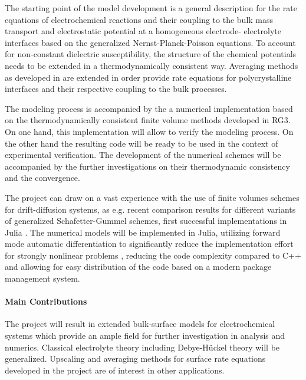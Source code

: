 \documentclass[a4paper,10pt]{article}
\begin{document}

The starting point  of the model development is  a general description
for the rate  equations of electrochemical reactions and their coupling to the bulk mass transport
and electrostatic potential at a homogeneous
electrode- electrolyte  interfaces based on the generalized Nernst-Planck-Poisson equations.
To account for non-constant dielectric susceptibility, the structure of the chemical potentials
needs to be extended in a thermodynamically consistent way.
Averaging methods as  developed in
\cite{JES}  are   extended  in   order  provide  rate   equations  for
polycrystalline interfaces  and their respective coupling to the bulk processes.

The modeling process is accompanied by the a numerical implementation based on the
thermodynamically consistent finite volume methods developed in RG3.
On one hand, this implementation will allow to verify the modeling process. On the other
hand the resulting code will be ready to be used in the context of experimental verification.
The development of the numerical schemes will be accompanied by the further investigations
on their thermodynamic consistency and the convergence.

The project can draw on a vast experience with the use of finite volumes schemes for drift-diffusion systems,
as e.g. recent comparison results for different variants of generalized Schafetter-Gummel
schemes, first successful implementations in Julia \cite{VagnerEtAl2019, VoronoiFVM}.
The numerical models will be implemented in  Julia, utilizing forward mode automatic
differentiation to significantly reduce the implementation
effort for strongly nonlinear problems \cite{VoronoiFVM}, reducing the code complexity compared
to C++ and allowing for easy distribution of the code based on a modern package management system.

\paragraph{Main Contributions}
The project will result in extended bulk-surface models for electrochemical systems which provide
an ample field for further investigation in analysis and numerics. 
Classical electrolyte theory including Debye-H\"uckel theory will be generalized.
Upscaling and averaging methods
for surface rate equations developed in the project are of interest in other applications.
\end{document}
